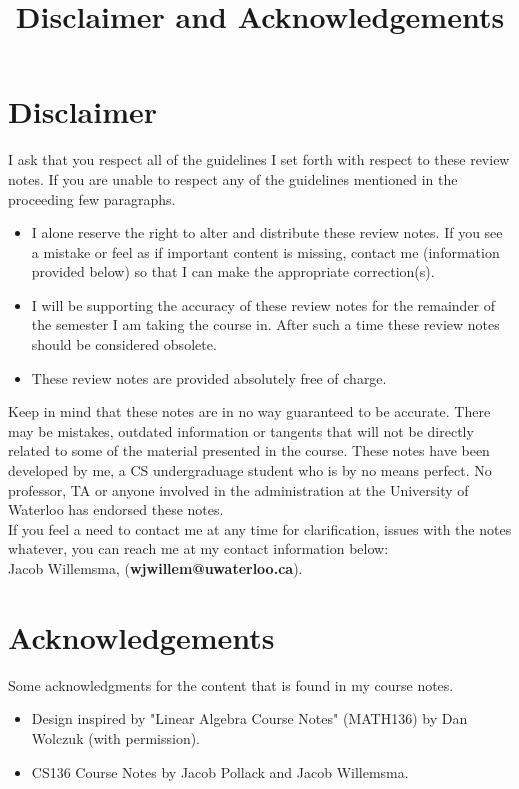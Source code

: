 \documentclass[12pt, twoside]{article}
\title{\textbf{Disclaimer and Acknowledgements}}
\begin{document}
\section{Disclaimer}

I ask that you respect all of the guidelines I set forth with respect to these review notes. If you are unable to respect any of the guidelines mentioned in the proceeding few paragraphs. \\
\begin{itemize}
\item I alone reserve the right to alter and distribute these review notes. If you see a mistake or feel as if important content is missing, contact me (information provided below) so that I can make the appropriate correction(s).
\item I will be supporting the accuracy of these review notes for the remainder of the semester I am taking the course in. After such a time these review notes should be considered obsolete.
\item These review notes are provided absolutely free of charge.
\end{itemize}

Keep in mind that these notes are in no way guaranteed to be accurate. There may be mistakes, outdated information or tangents that will not be directly related to some of the material presented in the course. These notes have been developed by me, a CS undergraduage student who is by no means perfect. No professor, TA or anyone involved in the administration at the University of Waterloo has endorsed these notes.\\

If you feel a need to contact me at any time for clarification, issues with the notes whatever, you can reach me at my contact information below:\\
Jacob Willemsma, (\textbf{wjwillem@uwaterloo.ca}).\\

\section{Acknowledgements}

Some acknowledgments for the content that is found in my course notes.

\begin{itemize}
\item Design inspired by "Linear Algebra Course Notes" (MATH136) by Dan Wolczuk (with permission).
\item CS136 Course Notes by Jacob Pollack and Jacob Willemsma.
\end{itemize}
\clearpage
\thispagestyle{empty}
\end{document}

